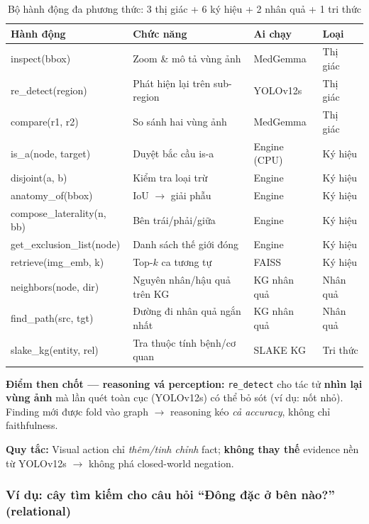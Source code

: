 \documentclass[11pt,a4paper]{article}
\begin{document}
\begin{table}[H]
\centering\small
\renewcommand{\arraystretch}{1.3}
\begin{tabular}{>{\ttfamily\small}p{4.2cm} p{4.5cm} p{2cm} p{2cm}}
\toprule
\textbf{Hành động} & \textbf{Chức năng} & \textbf{Ai chạy} & \textbf{Loại} \\
\midrule
inspect(bbox) & Zoom \& mô tả vùng ảnh & MedGemma & Thị giác \\
re\_detect(region) & Phát hiện lại trên sub-region & YOLOv12s & Thị giác \\
compare(r1, r2) & So sánh hai vùng ảnh & MedGemma & Thị giác \\
\midrule
is\_a(node, target) & Duyệt bắc cầu is-a & Engine (CPU) & Ký hiệu \\
disjoint(a, b) & Kiểm tra loại trừ & Engine & Ký hiệu \\
anatomy\_of(bbox) & IoU $\to$ giải phẫu & Engine & Ký hiệu \\
compose\_laterality(n, bb) & Bên trái/phải/giữa & Engine & Ký hiệu \\
get\_exclusion\_list(node) & Danh sách thế giới đóng & Engine & Ký hiệu \\
retrieve(img\_emb, k) & Top-$k$ ca tương tự & FAISS & Ký hiệu \\
\midrule
neighbors(node, dir) & Nguyên nhân/hậu quả trên KG & KG nhân quả & Nhân quả \\
find\_path(src, tgt) & Đường đi nhân quả ngắn nhất & KG nhân quả & Nhân quả \\
slake\_kg(entity, rel) & Tra thuộc tính bệnh/cơ quan & SLAKE KG & Tri thức \\
\bottomrule
\end{tabular}
\caption{Bộ hành động đa phương thức: 3 thị giác + 6 ký hiệu + 2 nhân quả + 1 tri thức}
\end{table}

\textbf{Điểm then chốt --- reasoning vá perception:} \texttt{re\_detect} cho tác tử \textbf{nhìn lại vùng ảnh} mà lần quét toàn cục (YOLOv12s) có thể bỏ sót (ví dụ: nốt nhỏ). Finding mới được fold vào graph $\to$ reasoning kéo \emph{cả accuracy}, không chỉ faithfulness.

\textbf{Quy tắc:} Visual action chỉ \emph{thêm/tinh chỉnh} fact; \textbf{không thay thế} evidence nền từ YOLOv12s $\to$ không phá closed-world negation.

\subsubsection{Ví dụ: cây tìm kiếm cho câu hỏi ``Đông đặc ở bên nào?'' (relational)}
\end{document}
